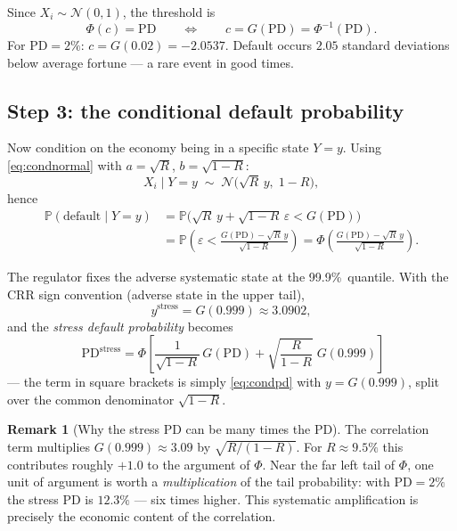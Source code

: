 \documentclass[11pt,a4paper]{report}
\theoremstyle{definition}
\newtheorem{remark}[definition]{Remark}
\theoremstyle{plain}
\newcommand{\PD}{\mathrm{PD}}
\begin{document}
Since $X_i\sim\mathcal{N}(0,1)$, the threshold is
\begin{equation}
  \Phi(c)=\PD
  \qquad\Longleftrightarrow\qquad
  c=G(\PD)=\Phi^{-1}(\PD).
  \label{eq:threshold}
\end{equation}
For $\PD=2\%$: $c=G(0.02)=-2.0537$. Default occurs $2.05$ standard
deviations below average fortune --- a rare event in good times.

\subsection{Step 3: the conditional default probability}

Now condition on the economy being in a specific state $Y=y$. Using
\eqref{eq:condnormal} with $a=\sqrt R$, $b=\sqrt{1-R}$:
\begin{equation}
  X_i\mid Y=y \;\sim\; \mathcal{N}\!\bigl(\sqrt{R}\,y,\;1-R\bigr),
\end{equation}
hence
\begin{align}
  \mathbb{P}(\text{default}\mid Y=y)
  &=\mathbb{P}\!\bigl(\sqrt{R}\,y+\sqrt{1-R}\,\varepsilon<G(\PD)\bigr)\\
  &=\mathbb{P}\!\left(\varepsilon<
      \frac{G(\PD)-\sqrt{R}\,y}{\sqrt{1-R}}\right)
   =\Phi\!\left(\frac{G(\PD)-\sqrt{R}\,y}{\sqrt{1-R}}\right).
  \label{eq:condpd}
\end{align}

The regulator fixes the adverse systematic state at the 99.9\%\ quantile.
With the CRR sign convention (adverse state in the upper tail),
\begin{equation}
  y^{\text{stress}}=G(0.999)\approx 3.0902 ,
\end{equation}
and the \emph{stress default probability} becomes
\begin{equation}
  \boxed{\;
  \PD^{\text{stress}}
  =\Phi\!\left[
  \frac{1}{\sqrt{1-R}}\,G(\PD)
  +\sqrt{\frac{R}{1-R}}\;G(0.999)
  \right]}
  \label{eq:pdstress}
\end{equation}
--- the term in square brackets is simply
\eqref{eq:condpd} with $y=G(0.999)$, split over the common denominator
$\sqrt{1-R}$.

\begin{remark}[Why the stress PD can be many times the PD]
The correlation term multiplies $G(0.999)\approx 3.09$ by
$\sqrt{R/(1-R)}$. For $R\approx 9.5\%$ this contributes roughly $+1.0$
to the argument of $\Phi$. Near the far left tail of $\Phi$, one unit
of argument is worth a \emph{multiplication} of the tail probability:
with $\PD=2\%$ the stress PD is $12.3\%$ --- six times higher. This
systematic amplification is precisely the economic content of the
correlation.
\end{remark}
\end{document}
